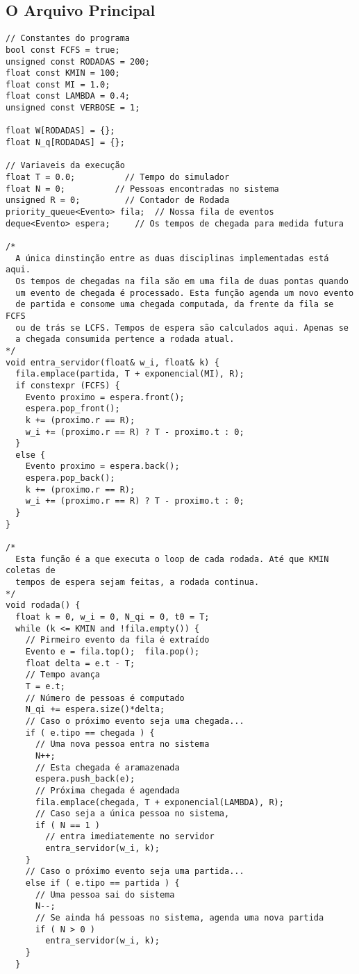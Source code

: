 \documentclass{article}
\begin{document}
\subsection{O Arquivo Principal}
\begin{verbatim}
// Constantes do programa
bool const FCFS = true;
unsigned const RODADAS = 200;
float const KMIN = 100;
float const MI = 1.0;
float const LAMBDA = 0.4;
unsigned const VERBOSE = 1;

float W[RODADAS] = {};
float N_q[RODADAS] = {};

// Variaveis da execução
float T = 0.0;          // Tempo do simulador
float N = 0;          // Pessoas encontradas no sistema 
unsigned R = 0;         // Contador de Rodada
priority_queue<Evento> fila;  // Nossa fila de eventos
deque<Evento> espera;     // Os tempos de chegada para medida futura

/* 
  A única dinstinção entre as duas disciplinas implementadas está aqui.
  Os tempos de chegadas na fila são em uma fila de duas pontas quando
  um evento de chegada é processado. Esta função agenda um novo evento
  de partida e consome uma chegada computada, da frente da fila se FCFS
  ou de trás se LCFS. Tempos de espera são calculados aqui. Apenas se
  a chegada consumida pertence a rodada atual.
*/
void entra_servidor(float& w_i, float& k) {
  fila.emplace(partida, T + exponencial(MI), R);
  if constexpr (FCFS) {
    Evento proximo = espera.front();
    espera.pop_front();
    k += (proximo.r == R);
    w_i += (proximo.r == R) ? T - proximo.t : 0;
  }
  else {
    Evento proximo = espera.back();
    espera.pop_back();
    k += (proximo.r == R);
    w_i += (proximo.r == R) ? T - proximo.t : 0;
  }
}

/*
  Esta função é a que executa o loop de cada rodada. Até que KMIN coletas de 
  tempos de espera sejam feitas, a rodada continua. 
*/
void rodada() {
  float k = 0, w_i = 0, N_qi = 0, t0 = T;
  while (k <= KMIN and !fila.empty()) {
    // Pirmeiro evento da fila é extraído
    Evento e = fila.top();  fila.pop();
    float delta = e.t - T;
    // Tempo avança
    T = e.t;
    // Número de pessoas é computado
    N_qi += espera.size()*delta;
    // Caso o próximo evento seja uma chegada...
    if ( e.tipo == chegada ) {
      // Uma nova pessoa entra no sistema 
      N++; 
      // Esta chegada é aramazenada
      espera.push_back(e);
      // Próxima chegada é agendada
      fila.emplace(chegada, T + exponencial(LAMBDA), R);
      // Caso seja a única pessoa no sistema, 
      if ( N == 1 ) 
        // entra imediatemente no servidor
        entra_servidor(w_i, k);
    } 
    // Caso o próximo evento seja uma partida...
    else if ( e.tipo == partida ) {
      // Uma pessoa sai do sistema
      N--;
      // Se ainda há pessoas no sistema, agenda uma nova partida
      if ( N > 0 ) 
        entra_servidor(w_i, k);
    }
  }


\end{verbatim}
\end{document}
